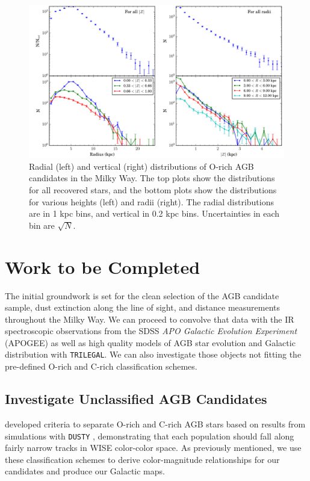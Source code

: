 \begin{figure}[h]
\centering
\includegraphics[width=6.5in]{figs/orich_radial_vertical_profile.pdf}
\caption{{\footnotesize Radial (left) and vertical (right) distributions of O-rich AGB candidates in the Milky Way. The top plots show the distributions for all recovered stars, and the bottom plots show the distributions for various heights (left) and radii (right). The radial distributions are in 1 kpc bins, and vertical in 0.2 kpc bins. Uncertainties in each bin are $\sqrt{N}$.}}
\label{fig:horvert_profile}
\end{figure}

\section{Work to be Completed}
The initial groundwork is set for the clean selection of the AGB candidate sample, dust extinction along the line of sight, and distance measurements throughout the Milky Way.  We can proceed to convolve that data with the IR spectroscopic observations from the SDSS \emph{APO Galactic Evolution Experiment} (APOGEE) as well as high quality models of AGB star evolution and Galactic distribution with {\tt TRILEGAL}. We can also investigate those objects not fitting the pre-defined O-rich and C-rich classification schemes.

\subsection{Investigate Unclassified AGB Candidates}
 \cite{2014MNRAS.442.3361N} developed criteria to separate O-rich and C-rich AGB stars based on results from simulations with {\tt DUSTY} \citep{1999astro.ph.10475I}, demonstrating that each population should fall along fairly narrow tracks in WISE color-color space. As previously mentioned, we use these classification schemes to derive color-magnitude relationships for our candidates and produce our Galactic maps. 
 
